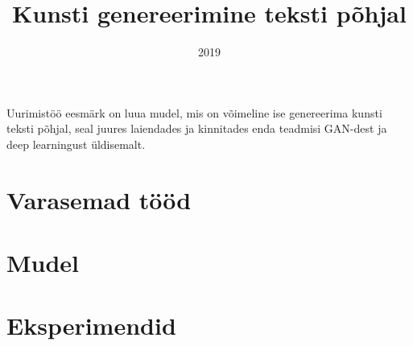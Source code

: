 \documentclass{vilgym}
\title{Kunsti genereerimine teksti põhjal}
\date{2019}
\begin{document}
    \maketitle
    \tableofcontents

    Uurimistöö eesmärk on luua mudel, mis on võimeline ise genereerima kunsti teksti põhjal, seal juures laiendades ja kinnitades enda teadmisi GAN-dest ja deep learningust üldisemalt.
    
    \section{Varasemad tööd}

    \section{Mudel}

    \section{Eksperimendid}


\end{document}
